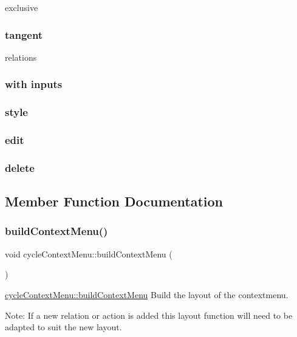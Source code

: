 exclusive \subsubsection*{tangent }

relations \subsubsection*{with inputs }

\subsubsection*{style }

\subsubsection*{edit }

\subsubsection*{delete }

\subsection{Member Function Documentation}
\mbox{\label{classcycle_context_menu_a155448ae220555423d26b055f50b6e49}} 
\subsubsection{\texorpdfstring{build\+Context\+Menu()}{buildContextMenu()}}
{\footnotesize\ttfamily void cycle\+Context\+Menu\+::build\+Context\+Menu (\begin{DoxyParamCaption}{ }\end{DoxyParamCaption})}



\mbox{\hyperlink{classcycle_context_menu_a155448ae220555423d26b055f50b6e49}{cycle\+Context\+Menu\+::build\+Context\+Menu}} Build the layout of the contextmenu. 

Note\+: If a new relation or action is added this layout function will need to be adapted to suit the new layout. \mbox{\label{classcycle_context_menu_ae807f1cddefcdedf9f8c60473bd287df}} 
